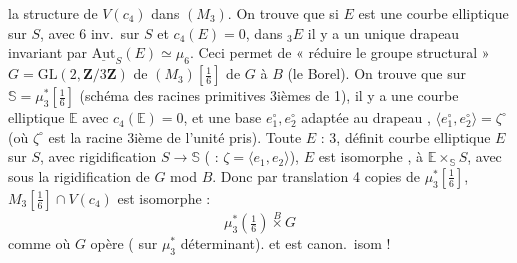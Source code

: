 \documentclass[11pt,a4paper]{article}
\begin{document}
\struck{\ill{}} la structure de $V(c_4)$ dans $(M_3)$. On trouve que si $E$
est une courbe elliptique sur $S$, avec 6 inv.\ sur $S$ et $c_4(E)=0$, dans
${}_3E$ il y a un unique drapeau invariant par
$\underline{\mathrm{Aut}}_S(E) \simeq \mu_6$. Ceci permet de « réduire le
groupe structural » $G = \mathrm{GL}(2,\mathbf{Z}/3\mathbf{Z})$ de
$(M_3)[\tfrac16]$ de $G$ à $B$ (le Borel). On trouve que sur $\mathbb{S} =
\mu_3^{*}[\tfrac16]$ (schéma des racines primitives 3ièmes de 1),
\struck{\ill{}} il y a une courbe elliptique $\mathbb{E}$ avec
$c_4(\mathbb{E})=0$, et une base $e_1^{\circ}, e_2^{\circ}$ adaptée au
drapeau \ill{}, $\langle e_1^{\circ}, e_2^{\circ}\rangle = \zeta^{\circ}$
(où $\zeta^{\circ}$ est la racine 3ième de l'unité \ill{} pris). Toute
\ill{} $E$ \ill{} \ill{} : \ill{}  \ill{} \ill{} 3, définit
\ill{} courbe elliptique $E$ sur $S$, avec rigidification \ill{}
$S \to \mathbb{S}$ (\ill{} : $\zeta = \langle e_1, e_2\rangle$),
\struck{\ill{}} $E$ est isomorphe \add{\ill{}} \ill{} \ill{}, \ill{}
\struck{\ill{}}  à $\mathbb{E}\times_{\mathbb{S}} S$,
avec  sous la rigidification \ill{} \ill{} \ill{} de $G$ mod $B$.
Donc \ill{} \ill{} par translation \ill{} \ill{} 4 copies de
$\mu_3^{*}[\tfrac16]$, $M_3[\tfrac16] \cap V(c_4)$ est isomorphe : \ill{}
\[
\mu_3^{*}(\tfrac16) \overset{B}{\times} G
\]
comme \ill{} où $G$ opère ( sur $\mu_3^{*}$ \ill{}
déterminant). et est canon.\ isom !


\end{document}
